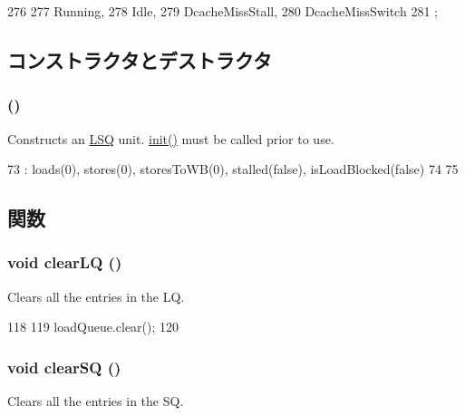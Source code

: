 \begin{DoxyCode}
276                 {
277         Running,
278         Idle,
279         DcacheMissStall,
280         DcacheMissSwitch
281     };
\end{DoxyCode}


\subsection{コンストラクタとデストラクタ}
\hypertarget{classOzoneLSQ_a31be199d33faeff7e77c7ed894288f5b}{
\subsubsection[{OzoneLSQ}]{ ()}}
\label{classOzoneLSQ_a31be199d33faeff7e77c7ed894288f5b}
Constructs an \hyperlink{classLSQ}{LSQ} unit. \hyperlink{classOzoneLSQ_ae8565b0968a8115705f1585e8aa21f75}{init()} must be called prior to use. 


\begin{DoxyCode}
73     : loads(0), stores(0), storesToWB(0), stalled(false), isLoadBlocked(false)
74 {
75 }
\end{DoxyCode}


\subsection{関数}
\hypertarget{classOzoneLSQ_ae3af532345dbe6519e8272d9cd677230}{
\subsubsection[{clearLQ}]{\setlength{\rightskip}{0pt plus 5cm}void clearLQ ()}}
\label{classOzoneLSQ_ae3af532345dbe6519e8272d9cd677230}
Clears all the entries in the LQ. 


\begin{DoxyCode}
118 {
119     loadQueue.clear();
120 }
\end{DoxyCode}
\hypertarget{classOzoneLSQ_a171cd7891063f418b1ee217f5c03537b}{
\subsubsection[{clearSQ}]{\setlength{\rightskip}{0pt plus 5cm}void clearSQ ()}}
\label{classOzoneLSQ_a171cd7891063f418b1ee217f5c03537b}
Clears all the entries in the SQ. 


